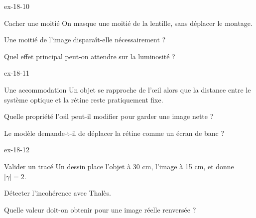 \begin{blocLivre}{ex-18-10}\begin{exercice}[3]{Cacher une moitié}
On masque une moitié de la lentille, sans déplacer le montage.
\begin{questions}
\item Une moitié de l’image disparaît-elle nécessairement ?
\item Quel effet principal peut-on attendre sur la luminosité ?
\end{questions}
\end{exercice}\end{blocLivre}
\begin{blocLivre}{ex-18-11}\begin{exercice}[3]{Une accommodation}
Un objet se rapproche de l’œil alors que la distance entre le système optique et la rétine reste pratiquement fixe.
\begin{questions}
\item Quelle propriété l’œil peut-il modifier pour garder une image nette ?
\item Le modèle demande-t-il de déplacer la rétine comme un écran de banc ?
\end{questions}
\end{exercice}\end{blocLivre}
\begin{blocLivre}{ex-18-12}\begin{exercice}[3]{Valider un tracé}
Un dessin place l’objet à 30 cm, l’image à 15 cm, et donne $|\gamma|=2$.
\begin{questions}
\item Détecter l’incohérence avec Thalès.
\item Quelle valeur doit-on obtenir pour une image réelle renversée ?
\end{questions}
\end{exercice}\end{blocLivre}


